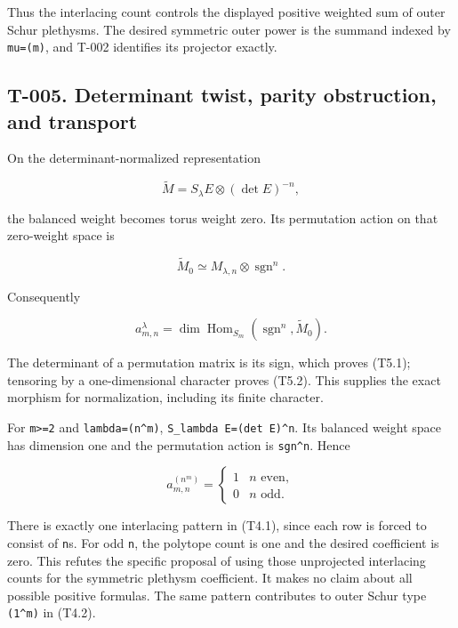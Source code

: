 \documentclass[
  10pt,
]{article}
\begin{document}
Thus the interlacing count controls the displayed positive weighted sum
of outer Schur plethysms. The desired symmetric outer power is the
summand indexed by
\texttt{\small mu=\allowbreak{}(\allowbreak{}m)\allowbreak{}}, and T-002
identifies its projector exactly.

\subsection{T-005. Determinant twist, parity obstruction, and
transport}\label{t-005.-determinant-twist-parity-obstruction-and-transport}

On the determinant-normalized representation

\[
\widetilde M=S_\lambda E\otimes(\det E)^{-n},
\]

the balanced weight becomes torus weight zero. Its permutation action on
that zero-weight space is

\[
\widetilde M_0\simeq M_{\lambda,n}\otimes\operatorname{sgn}^{n}.
\tag{T5.1}
\]

Consequently

\[
a_{m,n}^\lambda
=\dim\operatorname{Hom}_{S_m}(\operatorname{sgn}^{n},\widetilde M_0).
\tag{T5.2}
\]

The determinant of a permutation matrix is its sign, which proves
(T5.1); tensoring by a one-dimensional character proves (T5.2). This
supplies the exact morphism for normalization, including its finite
character.

For \texttt{\small m>=\allowbreak{}2} and
\texttt{\small lambda=\allowbreak{}(\allowbreak{}n\textasciicircum{}m)\allowbreak{}},
\texttt{\small S\_\allowbreak{}lambda E=\allowbreak{}(\allowbreak{}det E)\allowbreak{}\textasciicircum{}n}.
Its balanced weight space has dimension one and the permutation action
is \texttt{\small sgn\textasciicircum{}n}. Hence

\[
\boxed{a_{m,n}^{(n^m)}=\begin{cases}1&n\text{ even},\\0&n\text{ odd}.\end{cases}}
\tag{T5.3}
\]

There is exactly one interlacing pattern in (T4.1), since each row is
forced to consist of \texttt{\small n}s. For odd \texttt{\small n}, the
polytope count is one and the desired coefficient is zero. This refutes
the specific proposal of using those unprojected interlacing counts for
the symmetric plethysm coefficient. It makes no claim about all possible
positive formulas. The same pattern contributes to outer Schur type
\texttt{\small (\allowbreak{}1\textasciicircum{}m)\allowbreak{}} in
(T4.2).
\end{document}
